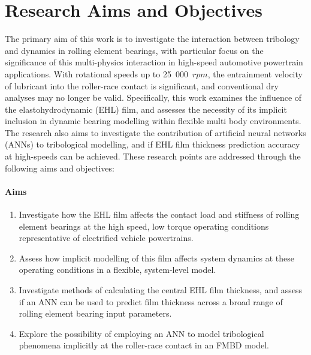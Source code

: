 \section{Research Aims and Objectives} \label{Research Questions}

The primary aim of this work is to investigate the interaction between tribology and dynamics in rolling element bearings, with particular focus on the significance of this multi-physics interaction in high-speed automotive powertrain applications. With rotational speeds up to 25~000~$rpm$, the entrainment velocity of lubricant into the roller-race contact is significant, and conventional dry analyses may no longer be valid. Specifically, this work examines the influence of the elastohydrodynamic (EHL) film, and assesses the necessity of its implicit inclusion in dynamic bearing modelling within flexible multi body environments. The research also aims to investigate the contribution of artificial neural networks (ANNs) to tribological modelling, and if EHL film thickness prediction accuracy at high-speeds can be achieved. These research points are addressed through the following aims and objectives:

\paragraph{Aims}
\begin{enumerate}
	\item Investigate how the EHL film affects the contact load and stiffness of rolling element bearings at the high speed, low torque operating conditions representative of electrified vehicle powertrains. 
	\item Assess how implicit modelling of this film affects system dynamics at these operating conditions in a flexible, system-level model.
	\item Investigate methods of calculating the central EHL film thickness, and assess if an ANN can be used to predict film thickness across a broad range of rolling element bearing input parameters.
	\item Explore the possibility of employing an ANN to model tribological phenomena implicitly at the roller-race contact in an FMBD model. 
\end{enumerate}

